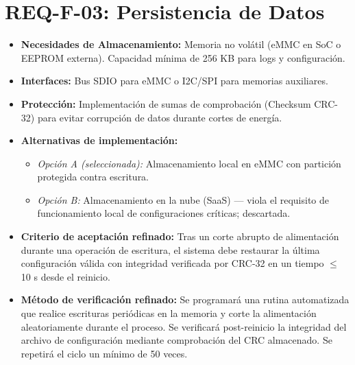 \documentclass[%
	paper=a4,
	twoside=false,
	parskip=half,
	chapterprefix=false,
	10pt,
	headings=normal,
	bibliography=totoc,
	listof=totoc,
	titlepage=on,
	captions=tableabove,
	draft=false, 
]{scrbook}%
\begin{document}
\section{REQ-F-03: Persistencia de Datos}
\begin{itemize}
    \item \textbf{Necesidades de Almacenamiento:} Memoria no volátil (eMMC en SoC o EEPROM externa). Capacidad mínima de 256 KB para logs y configuración.
    \item \textbf{Interfaces:} Bus SDIO para eMMC o I2C/SPI para memorias auxiliares.
    \item \textbf{Protección:} Implementación de sumas de comprobación (Checksum CRC-32) para evitar corrupción de datos durante cortes de energía.
    \item \textbf{Alternativas de implementación:}
        \begin{itemize}
            \item \textit{Opción A (seleccionada):} Almacenamiento local en eMMC con partición protegida contra escritura.
            \item \textit{Opción B:} Almacenamiento en la nube (SaaS) — viola el requisito de funcionamiento local de configuraciones críticas; descartada.
        \end{itemize}
    \item \textbf{Criterio de aceptación refinado:} Tras un corte abrupto de alimentación durante una operación de escritura, el sistema debe restaurar la última configuración válida con integridad verificada por CRC-32 en un tiempo $\leq$ 10 s desde el reinicio.
    \item \textbf{Método de verificación refinado:} Se programará una rutina automatizada que realice escrituras periódicas en la memoria y corte la alimentación aleatoriamente durante el proceso. Se verificará post-reinicio la integridad del archivo de configuración mediante comprobación del CRC almacenado. Se repetirá el ciclo un mínimo de 50 veces.
\end{itemize}

\end{document}
